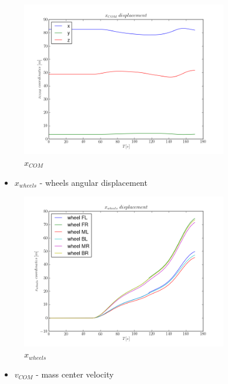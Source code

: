 \begin{figure}[H]
  \centering
    \includegraphics[width=0.8\textwidth]{xCOM8}
  \caption{$x_{COM}$}
\end{figure}

\begin{itemize}
  \item $x_{wheels}$ - wheels angular displacement 
\end{itemize}

\begin{figure}[H]
  \centering
    \includegraphics[width=0.8\textwidth]{xWHEELS8}
  \caption{$x_{wheels}$}
\end{figure}

\begin{itemize}
  \item $v_{COM}$ - mass center velocity
\end{itemize}

